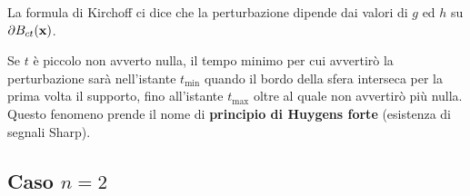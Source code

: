 \begin{oss}
\begin{figure}[H]
    \end{figure}
    \FloatBarrier

    La formula di Kirchoff ci dice che la perturbazione dipende dai valori di $g$ ed $h$ su $\displaystyle \partial B_{ct}(\mathbf{x})$.

    Se $t$ è piccolo non avverto nulla, il tempo minimo per cui avvertirò la perturbazione sarà nell'istante $\displaystyle t_{\min}$ quando il bordo della sfera interseca per la prima volta il supporto, fino all'istante $\displaystyle t_{\max}$ oltre al quale non avvertirò più nulla. Questo fenomeno prende il nome di \textbf{principio di Huygens forte }(esistenza di segnali Sharp).
\end{oss}

\subsection{Caso \texorpdfstring{$n=2$}{n=2}}

